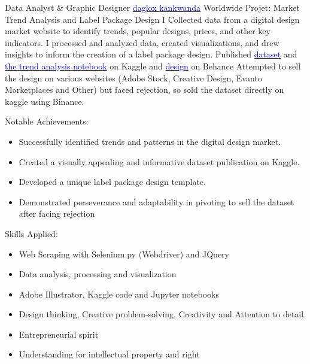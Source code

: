 \vspace{2mm}

    {Data Analyst \& Graphic Designer}
    {\href{https://www.linkedin.com/posts/daglox-kankwanda-59a617182_package-design-dataset-activity-7105563461622870017-fupP?utm_source=share&utm_medium=member_desktop}{\textcolor{blue}{daglox kankwanda}}}
    {Worldwide}
    {
    \newline
    Projet: Market Trend Analysis and Label Package Design
    \newline
    I Collected data from a digital design market website to identify trends, popular designs, prices, and other key indicators.
    I processed and analyzed data, created visualizations, and drew insights to inform the creation of a label package design.
    Published \href{https://www.kaggle.com/datasets/dagloxkankwanda/package-design-dataset}{\textcolor{blue}{dataset}} and 
    \href{https://www.kaggle.com/code/dagloxkankwanda/packaging-design-analysis}{\textcolor{blue}{the trend analysis notebook}} on Kaggle and 
    \href{https://www.behance.net/gallery/179054409/Label-package-design-templlate?tracking_source=search_projects|Daglox&l=0}{\textcolor{blue}{design}} on Behance
    Attempted to sell the design on various websites (Adobe Stock, Creative Design, Evanto Marketplaces and Other) but faced rejection, so sold the dataset directly on kaggle using Binance.
    } 
    {
        \newline
        Notable Achievements:
        \begin{itemize}
            \item Successfully identified trends and patterns in the digital design market.
            \item Created a visually appealing and informative dataset publication on Kaggle.
            \item Developed a unique label package design template.
            \item Demonstrated perseverance and adaptability in pivoting to sell the dataset after facing rejection
        \end{itemize}
        \vspace{1mm}
        Skills Applied:
        \begin{itemize}
            \item Web Scraping with Selenium.py (Webdriver) and JQuery
            \item Data analysis, processing and visualization
            \item Adobe Illustrator, Kaggle code and Jupyter notebooks
            \item Design thinking, Creative problem-solving, Creativity and Attention to detail.
            \item Entrepreneurial spirit
            \item Understanding for intellectual property and right
        \end{itemize}
    }

